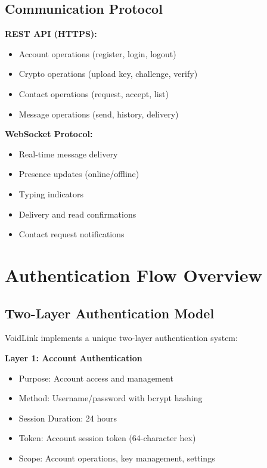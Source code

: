 \subsection{Communication Protocol}

\textbf{REST API (HTTPS):}
\begin{itemize}
    \item Account operations (register, login, logout)
    \item Crypto operations (upload key, challenge, verify)
    \item Contact operations (request, accept, list)
    \item Message operations (send, history, delivery)
\end{itemize}

\textbf{WebSocket Protocol:}
\begin{itemize}
    \item Real-time message delivery
    \item Presence updates (online/offline)
    \item Typing indicators
    \item Delivery and read confirmations
    \item Contact request notifications
\end{itemize}

\section{Authentication Flow Overview}

\subsection{Two-Layer Authentication Model}

VoidLink implements a unique two-layer authentication system:

\textbf{Layer 1: Account Authentication}
\begin{itemize}
    \item Purpose: Account access and management
    \item Method: Username/password with bcrypt hashing
    \item Session Duration: 24 hours
    \item Token: Account session token (64-character hex)
    \item Scope: Account operations, key management, settings
\end{itemize}

